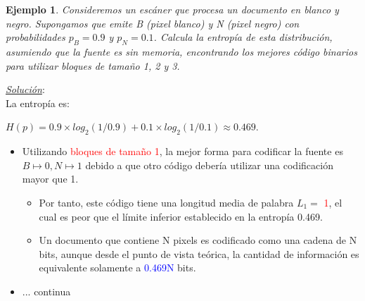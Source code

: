 \documentclass{beamer}
\theoremstyle{plain}
\theoremstyle{example}
\theoremstyle{example}
\newtheorem{ejemplo} [Ejemplo] {Ejemplo}
\begin{document}
\begin{frame}  \small 

\begin{ejemplo}

Consideremos un escáner que procesa un documento en blanco y negro. Supongamos que emite B (pixel blanco) y N (pixel negro) con probabilidades $p_B = 0.9$ y $p_N = 0.1$. Calcula la entropía de esta distribución, asumiendo que la fuente es sin memoria, encontrando los mejores código binarios para utilizar bloques de tamaño 1, 2 y 3.\\
\end{ejemplo}	

\pause
\footnotesize

\textit{\underline{Solución}}:\\
La entropía es:

\begin{center}
 $H(p) = 0.9 \times log_2(1/0.9) + 0.1  \times log_2(1/0.1) \approx 0.469.$
\end{center}


\begin{itemize}

\item Utilizando \textcolor{red}{bloques de tamaño 1}, la mejor forma para codificar la fuente es $B \mapsto 0, N \mapsto 1$ debido a que otro código debería utilizar una codificación mayor que 1.

\begin{itemize}  \footnotesize
\item
Por tanto, este código tiene una longitud media de palabra $L_1=$ \textcolor{red}{1}, el cual es peor que el límite inferior establecido en la entropía 0.469. 

\item
Un documento que contiene N pixels es codificado como una cadena de N bits, aunque desde el punto de vista teórica, la cantidad de información es equivalente solamente a \textcolor{blue}{0.469N} bits.
\end{itemize}

\item ... continua 

\end{itemize}
\end{frame} 
\end{document}
